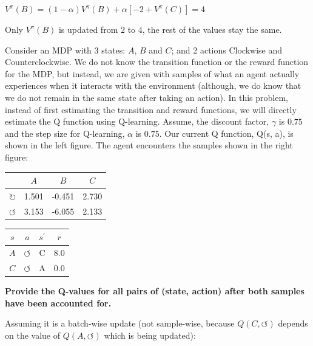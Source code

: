 \documentclass{homework}
\def\clockwise{\circlearrowright}
\def\counterclockwise{\circlearrowleft}
\begin{document}
$V^{\pi}(B) = (1 - \alpha) V^{\pi}(B) + \alpha [ -2 + V^{\pi}(C) ] = 4$

Only $V^{\pi}(B)$ is updated from $2$ to $4$, the rest of the values stay the same.

\clearpage
\exercise[6]
Consider an MDP with 3 states: $A$, $B$ and $C$; and 2 actions Clockwise and Counterclockwise. We do not know the transition function or the reward function for the MDP, but instead, we are given with samples of what an agent actually experiences when it interacts with the environment (although, we do know that we do not remain in the same state after taking an action). In this problem, instead of first estimating the transition and reward functions, we will directly estimate the Q function using Q-learning. Assume, the discount factor, $\gamma$ is $0.75$ and the step size for Q-learning, $\alpha$ is $0.75$.
Our current Q function, Q(s, a), is shown in the left figure. The agent encounters the samples shown in the right figure:
\begin{table}[h!]
    \centering
    \begin{tabular}{cccc}
        \toprule
        & $A$ & $B$ & $C$ \\
        \midrule
        $\clockwise$ & 1.501 & -0.451 & 2.730 \\
        $\counterclockwise$ & 3.153 & -6.055 & 2.133 \\
        \bottomrule
    \end{tabular}
    \qquad
    \begin{tabular}{cccc}
        \toprule
        $s$ & $a$ & $s^{\prime}$ & $r$ \\
        \midrule
        $A$ & $\counterclockwise$ & C & 8.0 \\
        $C$ & $\counterclockwise$ & A & 0.0 \\
        \bottomrule
    \end{tabular}
\end{table}

\textbf{Provide the Q-values for all pairs of (state, action) after both samples have been accounted for.}

Assuming it is a batch-wise update (not sample-wise, because $Q(C, \counterclockwise)$ depends on the value of $Q(A, \counterclockwise)$ which is being updated):
\end{document}
